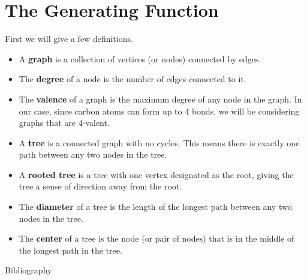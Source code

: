 \documentclass{article}
\begin{document}
\section{The Generating Function}
First we will give a few definitions.
\begin{itemize}
    \item A \textbf{graph} is a collection of vertices (or nodes) connected by edges.
    \item The \textbf{degree} of a node is the number of edges connected to it.
    \item The \textbf{valence} of a graph is the maximum degree of any node in the graph. In our case, since carbon atoms can form up to 4 bonds, we will be considering graphs that are 4-valent.
    \item A \textbf{tree} is a connected graph with no cycles. This means there is exactly one path between any two nodes in the tree.
    \item A \textbf{rooted tree} is a tree with one vertex designated as the root, giving the tree a sense of direction away from the root.
    \item The \textbf{diameter} of a tree is the length of the longest path between any two nodes in the tree.
    \item The \textbf{center} of a tree is the node (or pair of nodes) that is in the middle of the longest path in the tree.
\end{itemize}


\begin{section}{Bibliography}
    
    
\end{section}
\end{document}

